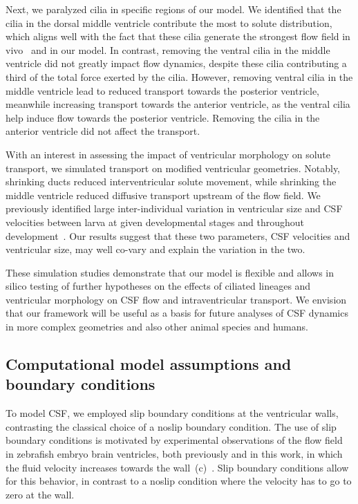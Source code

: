 \documentclass{WileyMSP-template}
\begin{document}
Next, we paralyzed cilia in specific regions of
our model. We identified that the cilia in the dorsal middle ventricle contribute
the most to solute distribution, which aligns well with the fact
that these cilia generate the strongest flow field in vivo~\cite{Olstad2019CiliaryDevelopment}
and in our model. In contrast, removing the ventral cilia in the middle ventricle
did not greatly impact flow dynamics, despite these cilia contributing a third of
the total force exerted by the cilia. However, removing ventral cilia in the middle ventricle
lead to reduced transport towards the posterior ventricle,
meanwhile increasing transport towards the anterior ventricle,
as the ventral cilia help induce flow towards the posterior ventricle.
Removing the cilia in the anterior ventricle did not affect the transport.

With an interest in assessing the impact of ventricular morphology on solute transport,
we simulated transport on modified ventricular geometries.
Notably, shrinking ducts reduced interventricular solute movement, while shrinking
the middle ventricle reduced diffusive transport upstream of the flow field.
We previously identified large inter-individual variation in ventricular size and
CSF velocities between larva at given developmental stages and throughout
development~\cite{Olstad2019CiliaryDevelopment, DGama2025MotileBrain, Jeong2024TheZebrafish}.
Our results suggest that these two parameters, CSF velocities and ventricular size,
may well co-vary and explain the variation in the two.

These simulation studies demonstrate that our model is flexible and allows in silico
testing of further hypotheses on the effects of ciliated
lineages and ventricular morphology on CSF flow and intraventricular transport.
We envision that our framework will be useful as a basis for future analyses of
CSF dynamics in more complex geometries and also other animal species and humans.

\subsection{Computational model assumptions and boundary conditions}
To model CSF, we employed slip boundary conditions at the ventricular walls,
contrasting the classical choice of a noslip boundary condition.
The use of slip boundary conditions is motivated by experimental observations of the
flow field in zebrafish embryo brain ventricles, both previously and in this work, in which
the fluid velocity increases towards the
wall~(c)~\cite{Olstad2019CiliaryDevelopment}. Slip boundary
conditions allow for this behavior, in contrast to a noslip condition where the velocity
has to go to zero at the wall.
\end{document}
